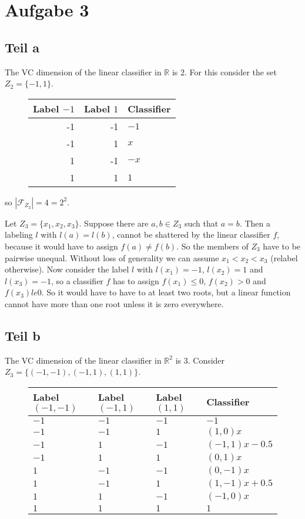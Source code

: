 \documentclass[10pt,a4paper]{article}
\begin{document}
\section{Aufgabe 3}

\subsection{Teil a}

The VC dimension of the linear classifier in $\mathbb{R}$ is $2$. For this
consider the set $Z_2 = \{ -1, 1 \}$.
\begin{figure}[h]
  \begin{tabular}{r|r|l}
    Label $-1$ & Label $1$ & Classifier\\
    \hline
    -1 & -1 & $-1$\\
    -1 & 1 & $x$\\
    1 & -1 & $-x$\\
    1 & 1 & $1$\\
  \end{tabular}
\end{figure}
so $|\mathcal{F}_{Z_2}| = 4 = 2^2$.

Let $Z_3 = \{ x_1, x_2, x_3 \}$. Suppose there are $a, b \in Z_3$ such that
$a = b$. Then a labeling $l$ with $l(a) = l(b)$, cannot be shattered by the
linear classifier $f$, because it would have to assign $f(a) \ne f(b)$. So the
members of $Z_3$ have to be pairwise unequal. Without loss of generality we can
assume $x_1 < x_2 < x_3$ (relabel otherwise). Now consider the label $l$ with
$l(x_1) = -1$, $l(x_2) = 1$ and $l(x_3) = -1$, so a classifier $f$ has to assign
$f(x_1) \le 0$, $f(x_2) > 0$ and $f(x_3) le 0$. So it would have to have to at
least two roots, but a linear function cannot have more than one root unless it
is zero everywhere.

\subsection{Teil b}

The VC dimension of the linear classifier in $\mathbb{R}^{2}$ is $3$. Consider
$Z_3 = \{ (-1, -1), (-1, 1), (1, 1) \}$.
\begin{figure}[h]
  \begin{tabular}{l|l|l|l}
    Label $(-1, -1)$ & Label $(-1, 1)$ & Label $(1, 1)$ & Classifier\\
    \hline
    $-1$ & $-1$ & $-1$ & $-1$\\
    $-1$ & $-1$ & $1$ & $(1, 0)x$\\
    $-1$ & $1$ & $-1$ & $(-1, 1)x - 0.5$\\
    $-1$ & $1$ & $1$ & $(0, 1)x$\\
    $1$ & $-1$ & $-1$ & $(0, -1)x$\\
    $1$ & $-1$ & $1$ & $(1, -1)x + 0.5$\\
    $1$ & $1$ & $-1$ & $(-1, 0)x$\\
    $1$ & $1$ & $1$ & $1$\\
  \end{tabular}
\end{figure}
\end{document}
